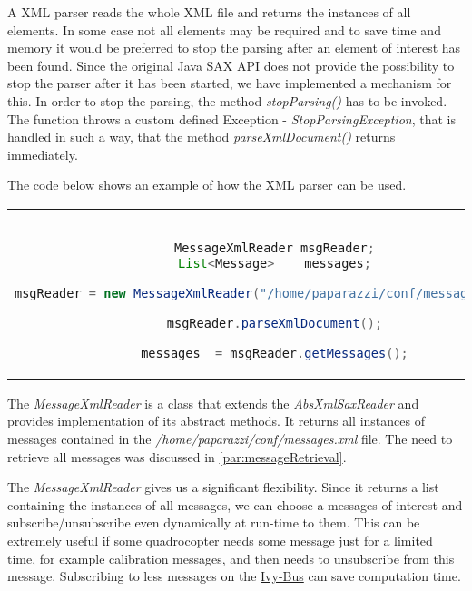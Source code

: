 A XML parser reads the whole XML file and returns the instances of all elements. In some case not all elements may be required and to save time and memory it would be preferred to stop the parsing after an element of interest has been found. 
Since the original Java SAX API does not provide the possibility to stop the parser after it has been started, we have implemented a mechanism for this.
In order to stop the parsing, the method \textit{stopParsing()} has to be invoked. The function throws a custom defined Exception - \textit{StopParsingException}, that is handled in such a way, that the method \textit{parseXmlDocument()} returns immediately.

The code below shows an example of how the XML parser can be used.

\begin{center}
\begin{tabular}{c}
\begin{lstlisting}[basicstyle=\small, language=Java, caption={XML parser example}]

MessageXmlReader msgReader;
List<Message>    messages;

msgReader = new MessageXmlReader("/home/paparazzi/conf/messages.xml");

msgReader.parseXmlDocument();

messages  = msgReader.getMessages();

\end{lstlisting}
\end{tabular}
\end{center}



The \textit{MessageXmlReader} is a class that extends the \textit{AbsXmlSaxReader} and provides implementation of its abstract methods. It returns all instances of messages contained in the \textit{/home/paparazzi/conf/messages.xml} file. The need to retrieve all messages was discussed 
in \ref{par:messageRetrieval}. \

The \textit{MessageXmlReader} gives us a significant flexibility. Since it returns a list containing the instances of all messages, we can choose a messages of interest and subscribe/unsubscribe even dynamically at run-time to them. This can be extremely useful if some quadrocopter needs some message just for a limited time, for example calibration messages, and then needs to unsubscribe from this message. Subscribing to less messages on the \hyperref[sec:ivyBusImplementation]{Ivy-Bus} can save computation time. \

